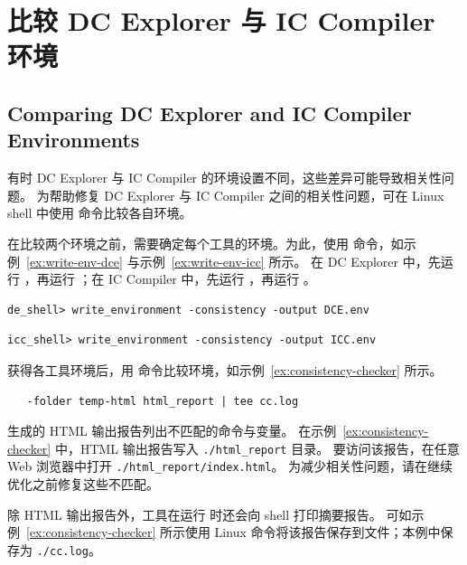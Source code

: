 \section{比较 DC Explorer 与 IC Compiler 环境}
\subsection*{Comparing DC Explorer and IC Compiler Environments}

有时 DC Explorer 与 IC Compiler 的环境设置不同，这些差异可能导致相关性问题。
为帮助修复 DC Explorer 与 IC Compiler 之间的相关性问题，可在 Linux shell 中使用  命令比较各自环境。

在比较两个环境之前，需要确定每个工具的环境。为此，使用  命令，如示例~\ref{ex:write-env-dce} 与示例~\ref{ex:write-env-icc} 所示。
在 DC Explorer 中，先运行 ，再运行 ；在 IC Compiler 中，先运行 ，再运行 。

\begin{lstlisting}[caption={在 DC Explorer 中使用 write\_environment},label=ex:write-env-dce]
de_shell> write_environment -consistency -output DCE.env
\end{lstlisting}

\begin{lstlisting}[caption={在 IC Compiler 中使用 write\_environment},label=ex:write-env-icc]
icc_shell> write_environment -consistency -output ICC.env
\end{lstlisting}

获得各工具环境后，用  命令比较环境，如示例~\ref{ex:consistency-checker} 所示。

\begin{lstlisting}[caption={比较 DC Explorer 与 IC Compiler 环境},label=ex:consistency-checker]
%consistency_checker -file1 DCE.env -file2 ICC.env \
   -folder temp-html html_report | tee cc.log
\end{lstlisting}

生成的 HTML 输出报告列出不匹配的命令与变量。
在示例~\ref{ex:consistency-checker} 中，HTML 输出报告写入 \texttt{./html\_report} 目录。
要访问该报告，在任意 Web 浏览器中打开 \texttt{./html\_report/index.html}。
为减少相关性问题，请在继续优化之前修复这些不匹配。

除 HTML 输出报告外，工具在运行  时还会向 shell 打印摘要报告。
可如示例~\ref{ex:consistency-checker} 所示使用 Linux  命令将该报告保存到文件；本例中保存为 \texttt{./cc.log}。

